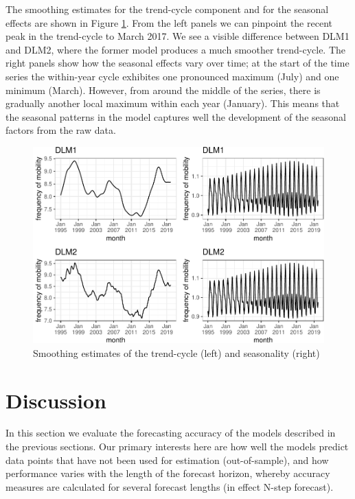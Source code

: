 \documentclass[12pt, a4paper]{article}
\begin{document}
The smoothing estimates for the trend-cycle component and for the
seasonal effects are shown in Figure \ref{fig:dlm-smoothed}. From the
left panels we can pinpoint the recent peak in the trend-cycle to March
2017. We see a visible difference between DLM1 and DLM2, where the
former model produces a much smoother trend-cycle. The right panels show how the
seasonal effects vary over time; at the start of the time series the
within-year cycle exhibites one pronounced maximum (July) and one
minimum (March). However, from around the middle of the series, there is
gradually another local maximum within each year (January). This means
that the seasonal patterns in the model captures well the development of
the seasonal factors from the raw data.

\begin{figure}[H]
  \caption{\label{fig:dlm-smoothed}Smoothing estimates of the trend-cycle (left) and
seasonality (right)}
\centering
\includegraphics[scale = 0.8]{../figs/freq--dlm-smoothed-1.pdf}
\end{figure}

\section{Discussion}\label{discussion}

In this section we evaluate the forecasting accuracy of the models
described in the previous sections. Our primary interests here are how
well the models predict data points that have not been used for
estimation (out-of-sample), and how performance varies with the length
of the forecast horizon, whereby accuracy measures are calculated for
several forecast lengths (in effect N-step forecast).
\end{document}
